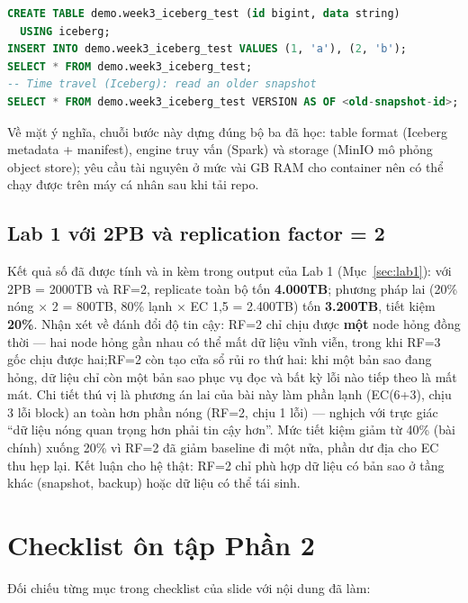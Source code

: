 \documentclass[12pt,a4paper,oneside]{article}
\begin{document}
\begin{lstlisting}[language=SQL, caption={SQL kiểm chứng sau khi vào spark-sql (tạo bảng Iceberg và truy vấn)}]
CREATE TABLE demo.week3_iceberg_test (id bigint, data string)
  USING iceberg;
INSERT INTO demo.week3_iceberg_test VALUES (1, 'a'), (2, 'b');
SELECT * FROM demo.week3_iceberg_test;
-- Time travel (Iceberg): read an older snapshot
SELECT * FROM demo.week3_iceberg_test VERSION AS OF <old-snapshot-id>;
\end{lstlisting}

Về mặt ý nghĩa, chuỗi bước này dựng đúng bộ ba đã học: table format (Iceberg metadata + manifest), engine truy vấn (Spark) và storage (MinIO mô phỏng object store); yêu cầu tài nguyên ở mức vài GB RAM cho container nên có thể chạy được trên máy cá nhân sau khi tải repo.

\subsection{Lab 1 với 2PB và replication factor = 2}

Kết quả số đã được tính và in kèm trong output của Lab 1 (Mục~\ref{sec:lab1}): với 2PB = 2000TB và RF=2, replicate toàn bộ tốn \textbf{4.000TB}; phương pháp lai (20\% nóng × 2 = 800TB, 80\% lạnh × EC 1,5 = 2.400TB) tốn \textbf{3.200TB}, tiết kiệm \textbf{20\%}. Nhận xét về đánh đổi độ tin cậy: RF=2 chỉ chịu được \textbf{một} node hỏng đồng thời --- hai node hỏng gần nhau có thể mất dữ liệu vĩnh viễn, trong khi RF=3 gốc chịu được hai;RF=2 còn tạo cửa sổ rủi ro thứ hai: khi một bản sao đang hỏng, dữ liệu chỉ còn một bản sao phục vụ đọc và bất kỳ lỗi nào tiếp theo là mất mát. Chi tiết thú vị là phương án lai của bài này làm phần lạnh (EC(6+3), chịu 3 lỗi block) an toàn hơn phần nóng (RF=2, chịu 1 lỗi) --- nghịch với trực giác ``dữ liệu nóng quan trọng hơn phải tin cậy hơn''. Mức tiết kiệm giảm từ 40\% (bài chính) xuống 20\% vì RF=2 đã giảm baseline đi một nửa, phần dư địa cho EC thu hẹp lại. Kết luận cho hệ thật: RF=2 chỉ phù hợp dữ liệu có bản sao ở tầng khác (snapshot, backup) hoặc dữ liệu có thể tái sinh.

\section{Checklist ôn tập Phần 2}

Đối chiếu từng mục trong checklist của slide với nội dung đã làm:
\end{document}
